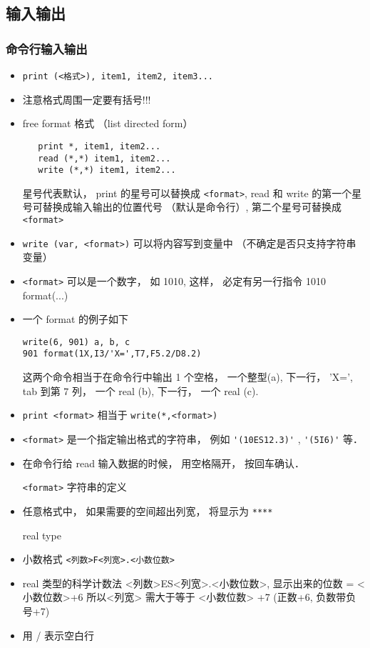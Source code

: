 \subsection{输入输出}

\subsubsection{命令行输入输出}
\begin{itemize}
\item \verb`print (<格式>), item1, item2, item3...`
\item 注意格式周围一定要有括号!!!
\item free format 格式 （list directed form）
\begin{lstlisting}
   print *, item1, item2...
   read (*,*) item1, item2... 
   write (*,*) item1, item2...
\end{lstlisting}
   星号代表默认， print 的星号可以替换成 \verb`<format>`, read 和 write 的第一个星号可替换成输入输出的位置代号 （默认是命令行）, 第二个星号可替换成 \verb`<format>`
\item \verb`write (var, <format>)` 可以将内容写到变量中 （不确定是否只支持字符串变量）
\item \verb`<format>` 可以是一个数字， 如 1010, 这样， 必定有另一行指令 1010 format(...)
\item 一个 format 的例子如下
\begin{lstlisting}
write(6, 901) a, b, c
901 format(1X,I3/'X=',T7,F5.2/D8.2)
\end{lstlisting}
这两个命令相当于在命令行中输出 1 个空格， 一个整型(a), 下一行， 'X=', tab 到第 7 列， 一个 real (b), 下一行， 一个 real (c).
\item \verb`print <format>` 相当于 \verb`write(*,<format>)`
\item \verb`<format>` 是一个指定输出格式的字符串， 例如 \verb|'(10ES12.3)'| , \verb|'(5I6)'| 等．
\item 在命令行给 read 输入数据的时候， 用空格隔开， 按回车确认．

\verb`<format>` 字符串的定义
\item 任意格式中， 如果需要的空间超出列宽， 将显示为 \verb`****`

real type
\item 小数格式 \verb|<列数>F<列宽>.<小数位数>|
\item real 类型的科学计数法  <列数>ES<列宽>.<小数位数>, 显示出来的位数 = <小数位数>+6
  所以<列宽> 需大于等于 <小数位数> +7 (正数+6, 负数带负号+7)
\item 用 / 表示空白行


\end{itemize}
